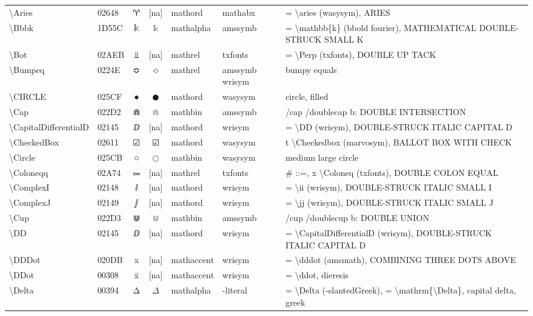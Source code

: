 \documentclass[a4paper,landscape]{article}
\begin{document}
\begin{longtable}{llcclll}
\textbackslash{}Aries & 02648 & \textsf ♈ & [na] & mathord & mathabx & = \textbackslash{}aries (wasysym),  ARIES \\
\textbackslash{}Bbbk & 1D55C & 𝕜 & $\Bbbk$ & mathalpha & amssymb & = \textbackslash{}mathbb\{k\} (bbold fourier),  MATHEMATICAL DOUBLE-STRUCK SMALL K \\
\textbackslash{}Bot & 02AEB & ⫫ & [na] & mathrel & txfonts & = \textbackslash{}Perp (txfonts), DOUBLE UP TACK \\
\textbackslash{}Bumpeq & 0224E & ≎ & $\Bumpeq$ & mathrel & amssymb wrisym & bumpy equals \\
\textbackslash{}CIRCLE & 025CF & ● & $\CIRCLE$ & mathord & wasysym & circle, filled \\
\textbackslash{}Cap & 022D2 & ⋒ & $\Cap$ & mathbin & amssymb & /cap /doublecap b: DOUBLE INTERSECTION \\
\textbackslash{}CapitalDifferentialD & 02145 & ⅅ & [na] & mathord & wrisym & = \textbackslash{}DD (wrisym), DOUBLE-STRUCK ITALIC CAPITAL D \\
\textbackslash{}CheckedBox & 02611 & \textsf ☑ & $\CheckedBox$ & mathord & wasysym & t \textbackslash{}Checkedbox (marvosym), BALLOT BOX WITH CHECK \\
\textbackslash{}Circle & 025CB & ○ & $\Circle$ & mathbin & wasysym & medium large circle \\
\textbackslash{}Coloneqq & 02A74 & ⩴ & [na] & mathrel & txfonts & \# ::=, x \textbackslash{}Coloneq (txfonts), DOUBLE COLON EQUAL \\
\textbackslash{}ComplexI & 02148 & ⅈ & [na] & mathord & wrisym & = \textbackslash{}ii (wrisym), DOUBLE-STRUCK ITALIC SMALL I \\
\textbackslash{}ComplexJ & 02149 & ⅉ & [na] & mathord & wrisym & = \textbackslash{}jj (wrisym), DOUBLE-STRUCK ITALIC SMALL J \\
\textbackslash{}Cup & 022D3 & ⋓ & $\Cup$ & mathbin & amssymb & /cup /doublecup b: DOUBLE UNION \\
\textbackslash{}DD & 02145 & ⅅ & [na] & mathord & wrisym & = \textbackslash{}CapitalDifferentialD (wrisym),  DOUBLE-STRUCK ITALIC CAPITAL D \\
\textbackslash{}DDDot & 020DB & x⃛ & [na] & mathaccent & wrisym & = \textbackslash{}dddot (amsmath),  COMBINING THREE DOTS ABOVE \\
\textbackslash{}DDot & 00308 & ẍ & [na] & mathaccent & wrisym & = \textbackslash{}ddot,  dieresis \\
\textbackslash{}Delta & 00394 & Δ & $\Delta$ & mathalpha & -literal & = \textbackslash{}Delta (-slantedGreek), = \textbackslash{}mathrm\{\textbackslash{}Delta\}, capital delta, greek \\

\end{longtable}
\end{document}
